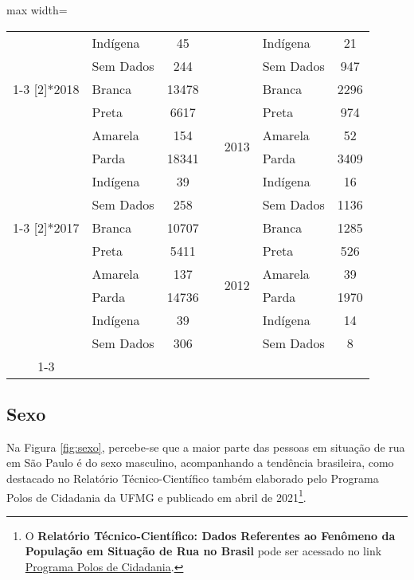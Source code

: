 \documentclass[14pt]{extarticle}
\begin{document}
\begin{table}[htbp]
\begin{adjustbox}{max width=\linewidth}
\begin{tabular}{clccclc}
         & Indígena & 45   &      &      & Indígena & 21 \\
         & Sem Dados & 244  &      &      & Sem Dados & 947 \\
\cmidrule{1-3}\cmidrule{5-7}    \multirow{6}[2]{*}{2018} & Branca & 13478 &      & \multirow{6}[2]{*}{2013} & Branca & 2296 \\
         & Preta & 6617 &      &      & Preta & 974 \\
         & Amarela & 154  &      &      & Amarela & 52 \\
         & Parda & 18341 &      &      & Parda & 3409 \\
         & Indígena & 39   &      &      & Indígena & 16 \\
         & Sem Dados & 258  &      &      & Sem Dados & 1136 \\
\cmidrule{1-3}\cmidrule{5-7}    \multirow{6}[2]{*}{2017} & Branca & 10707 &      & \multirow{6}[2]{*}{2012} & Branca & 1285 \\
         & Preta & 5411 &      &      & Preta & 526 \\
         & Amarela & 137  &      &      & Amarela & 39 \\
         & Parda & 14736 &      &      & Parda & 1970 \\
         & Indígena & 39   &      &      & Indígena & 14 \\
         & Sem Dados & 306  &      &      & Sem Dados & 8 \\
\cmidrule{1-3}\cmidrule{5-7}    
\end{tabular}%
\end{adjustbox}
  \label{tab:tab_cor2}%
\end{table}%




\subsection{Sexo}
\label{sexo}

Na Figura \ref{fig:sexo}, percebe-se que a maior parte das pessoas em situação de rua em São Paulo é do sexo masculino, acompanhando a tendência brasileira, como destacado no Relatório Técnico-Científico também elaborado pelo Programa Polos de Cidadania da UFMG e publicado em abril de 2021\footnote{O \textbf{Relatório Técnico-Científico: Dados Referentes ao Fenômeno da População em Situação de Rua no Brasil} pode ser acessado no link \href{https://polos.direito.ufmg.br/wp-content/uploads/2021/07/Relatorio-Incontaveis-2021.pdf}{Programa Polos de Cidadania}.}.\\
\end{document}
